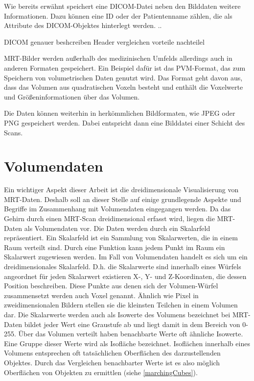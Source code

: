 Wie bereits erwähnt speichert eine DICOM-Datei neben den Bilddaten weitere Informationen. Dazu können eine ID oder der Patientenname zählen, die als Attribute des DICOM-Objektes hinterlegt werden. 
..

DICOM genauer beshcreiben
Header vergleichen
vorteile nachteilel

MRT-Bilder werden außerhalb des medizinischen Umfelds allerdings auch in anderen Formaten gespeichert. 
Ein Beispiel dafür ist das PVM-Format, das zum Speichern von volumetrischen Daten genutzt wird. Das Format geht davon aus, dass das Volumen aus quadratischen Voxeln besteht und enthält die Voxelwerte und Größeninformationen über das Volumen.

Die Daten können weiterhin in herkömmlichen Bildformaten, wie JPEG oder PNG gespeichert werden. Dabei entspricht dann eine Bilddatei einer Schicht des Scans. 
 

\section{Volumendaten}							  	  %

Ein wichtiger Aspekt dieser Arbeit ist die dreidimensionale Visualisierung von MRT-Daten. Deshalb soll an dieser Stelle auf einige grundlegende Aspekte und Begriffe im Zusammenhang mit Volumendaten eingegangen werden. Da das Gehirn durch einen MRT-Scan dreidimensional erfasst wird, liegen die MRT-Daten als Volumendaten vor. Die Daten werden durch ein Skalarfeld repräsentiert. Ein Skalarfeld ist ein Sammlung von Skalarwerten, die in einem Raum verteilt sind. Durch eine Funktion kann jedem Punkt im Raum ein Skalarwert zugewiesen werden. Im Fall von Volumendaten handelt es sich um ein dreidimensionales Skalarfeld. D.h. die Skalarwerte sind innerhalb eines Würfels angeordnet für jeden Skalarwert existieren X-, Y- und Z-Koordinaten, die dessen Position beschreiben. 
Diese Punkte aus denen sich der Volumen-Würfel zusammensetzt werden auch Voxel genannt. Ähnlich wie Pixel in zweidimensionalen Bildern stellen sie die kleinsten Teilchen in einem Volumen dar. 
Die Skalarwerte werden auch als Isowerte des Volumens bezeichnet bei MRT-Daten bildet jeder Wert eine Graustufe ab und liegt damit in dem Bereich von 0-255. 
Über das Volumen verteilt haben benachbarte Werte oft ähnliche Isowerte. Eine Gruppe dieser Werte wird als Isofläche bezeichnet. Isoflächen innerhalb eines Volumens entsprechen oft tatsächlichen Oberflächen des darzustellenden Objektes. Durch das Vergleichen benachbarter Werte ist es also möglich Oberflächen von Objekten zu ermittlen (siehe \ref{marchingCubes}). 

